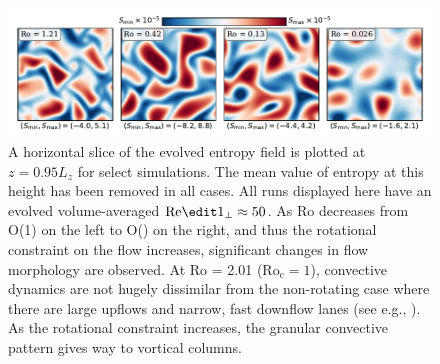 \documentclass[twocolumn, amsmath, amsfonts, amssymb, trackchanges]{aastex62}
\newcommand{\con}{\ensuremath{\text{Ro}_{\text{c}}}}
\begin{document}
\begin{figure}[t]
    \includegraphics[width=\textwidth]{dynamics_plot.pdf}
    \caption{ A horizontal slice of the evolved entropy field is plotted at $z = 0.95L_z$
    for select simulations. The mean value of entropy at this height has been removed in all
    cases. All runs displayed here have an evolved volume-averaged $\text{Re}\edit1{_\perp \approx 50}$. 
    As Ro decreases from O(1) on the left to O() on the right, and thus the rotational
    constraint on the flow increases, significant changes in flow morphology are observed.
    At Ro = 2.01 ($\con = 1$), convective dynamics are not hugely dissimilar from the non-rotating
    case where there are large upflows and narrow, fast downflow lanes (see e.g., \AB).
    As the rotational constraint increases, the granular convective pattern gives way
    to vortical columns.
    \label{fig:dynamics_plot} }
\end{figure}
\end{document}
